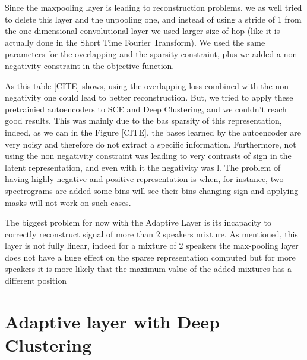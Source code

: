 \documentclass[master, tikz, final,11pt, dvipdfmx]{iscs-thesis}
\begin{document}
Since the maxpooling layer is leading to reconstruction problems, we as well tried to delete this layer and the unpooling one, and instead of using a stride of 1 from the one dimensional convolutional layer we used larger size of hop (like it is actually done in the Short Time Fourier Transform). We used the same parameters for the overlapping and the sparsity constraint, plus we added a non negativity constraint in the objective function.

As this table [CITE] shows, using the overlapping loss combined with the non-negativity one could lead to better reconstruction. But, we tried to apply these pretrainied autoencoders to SCE and Deep Clustering, and we couldn't reach good results. This was mainly due to the bas sparsity of this representation, indeed, as we can in the Figure [CITE], the bases learned by the autoencoder are very noisy and therefore do not extract a specific information. Furthermore, not using the non negativity constraint was leading to very contrasts of sign in the latent representation, and even with it the negativity was l. The problem of having highly negative and positive representation is when, for instance, two spectrograms are added some bins will see their bins changing sign and applying masks will not work on such cases.

The biggest problem for now with the Adaptive Layer is its incapacity to correctly reconstruct signal of more than 2 speakers mixture. As mentioned, this layer is not fully linear, indeed for a mixture of 2 speakers the max-pooling layer does not have a huge effect on the sparse representation computed but for more speakers it is more likely that the maximum value of the added mixtures has a different position

\section{Adaptive layer with Deep Clustering}
\end{document}

